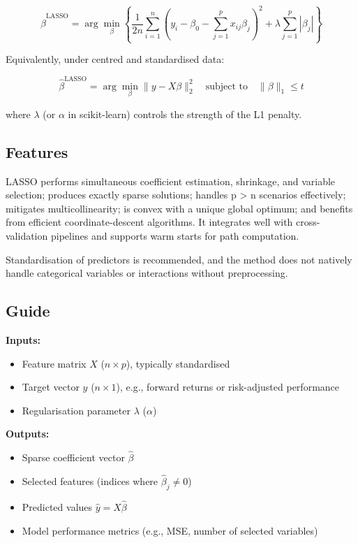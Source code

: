 \documentclass[11pt,a4paper]{article}
\begin{document}
\[
\hat{\beta}^{\text{LASSO}} = \arg\min_{\beta} \left\{ \frac{1}{2n} \sum_{i=1}^n (y_i - \beta_0 - \sum_{j=1}^p x_{ij} \beta_j)^2 + \lambda \sum_{j=1}^p |\beta_j| \right\}
\]

Equivalently, under centred and standardised data:

\[
\hat{\beta}^{\text{LASSO}} = \arg\min_{\beta} \| y - X\beta \|^2_2 \quad \text{subject to} \quad \| \beta \|_1 \leq t
\]

where $\lambda$ (or $\alpha$ in scikit-learn) controls the strength of the L1 penalty.

\subsection{Features}
LASSO performs simultaneous coefficient estimation, shrinkage, and variable selection; produces exactly sparse solutions; handles p > n scenarios effectively; mitigates multicollinearity; is convex with a unique global optimum; and benefits from efficient coordinate-descent algorithms. It integrates well with cross-validation pipelines and supports warm starts for path computation.

Standardisation of predictors is recommended, and the method does not natively handle categorical variables or interactions without preprocessing.

\subsection{Guide}
\textbf{Inputs:}
\begin{itemize}
\item Feature matrix \( X \) ($n \times p$), typically standardised
\item Target vector \( y \) ($n \times 1$), e.g., forward returns or risk-adjusted performance
\item Regularisation parameter \( \lambda \) ($\alpha$)
\end{itemize}

\textbf{Outputs:}
\begin{itemize}
\item Sparse coefficient vector \( \hat{\beta} \)
\item Selected features (indices where \( \hat{\beta}_j \neq 0 \))
\item Predicted values \( \hat{y} = X \hat{\beta} \)
\item Model performance metrics (e.g., MSE, number of selected variables)
\end{itemize}
\end{document}
